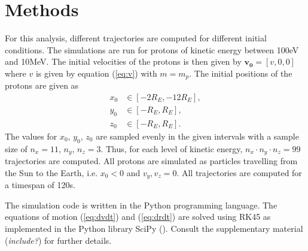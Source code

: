 \section{Methods}
For this analysis, different trajectories are computed for different initial conditions. 
The simulations are run for protons of kinetic energy between 100eV and 10MeV.
The initial velocities of the protons is then given by $\bm{v_0} = [v,0,0]$ where $v$ is given by equation (\ref{eq:v}) with $m=m_p$.
The initial positions of the protons are given as
\begin{align*}
    x_0 &\in [-2R_E, -12R_E], \\
    y_0 &\in [-R_E, R_E], \\
    z_0 &\in [-R_E,R_E].  
\end{align*}
The values for $x_0,\,y_0,\,z_0$ are sampled evenly in the given intervals with a sample size of $n_x=11$, $n_y,\,n_z = 3$. 
Thus, for each level of kinetic energy, $n_x \cdot n_y \cdot n_z = 99$ trajectories are computed.
All protons are simulated as particles travelling from the Sun to the Earth, i.e. $x_0 < 0$ and $v_y, v_z = 0$.
All trajectories are computed for a timespan of 120s. 

The simulation code is written in the Python programming language. 
The equations of motion (\ref{eq:dvdt}) and (\ref{eq:drdt}) are solved using RK45 as implemented in the Python library SciPy (\cite{scipy_ivp}).
Consult the supplementary material (\textit{include?}) for further details.  
